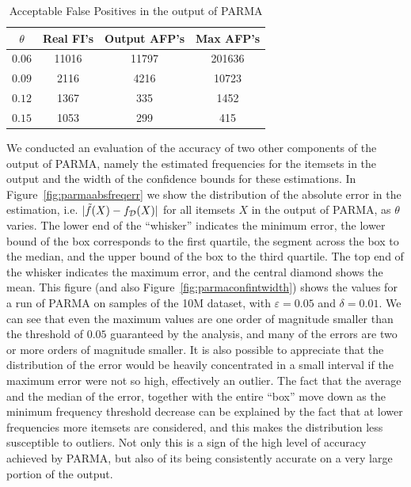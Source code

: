 \begin{table}
  \centering
  \begin{tabular}{cccc}
    \hline
    $\theta$ & Real FI's & Output AFP's & Max AFP's \\
    \hline
    $0.06$ & 11016 & 11797 & 201636 \\
    $0.09$ & 2116& 4216& 10723 \\
    $0.12$ & 1367& 335& 1452\\
    $0.15$ & 1053& 299& 415\\
    \hline
  \end{tabular}
  \caption{Acceptable False Positives in the output of PARMA}
  \label{tab:falsepositives}
\end{table}

We conducted an evaluation of the accuracy of two other components of the
output of PARMA, namely the estimated frequencies for the itemsets in the output
and the width of the confidence bounds for these estimations. In
Figure~\ref{fig:parmaabsfreqerr} we show the distribution of the absolute error in
the estimation, i.e. $|\tilde{f}(X)-f_{\cal D}(X)|$ for all itemsets $X$ in the
output of PARMA, as $\theta$ varies. The lower end of the ``whisker'' indicates the minimum error,
the lower bound of the box corresponds to the first quartile, the segment across
the box to the median, and the upper bound of the box to the third quartile. The
top end of the whisker indicates the maximum error, and the central diamond
shows the mean. This figure (and also Figure~\ref{fig:parmaconfintwidth}) shows the values
for a run of PARMA on samples of the 10M dataset, with $\varepsilon=0.05$ and
$\delta=0.01$. We can see that even the maximum values are one order of
magnitude smaller than the threshold of $0.05$ guaranteed by the analysis, and
many of the errors are two or more orders of magnitude smaller. It is also
possible to appreciate that the distribution of the error would be heavily concentrated in a
small interval if the maximum error were not so high, effectively an outlier.
The fact that the average and the median of the error, together with the entire ``box'' move down as the
minimum frequency threshold decrease can be explained by the fact that at lower
frequencies more itemsets are considered, and this makes the distribution less
susceptible to outliers. Not only this is a sign of the high level of accuracy
achieved by PARMA, but also of its being consistently accurate on
a very large portion of the output.

